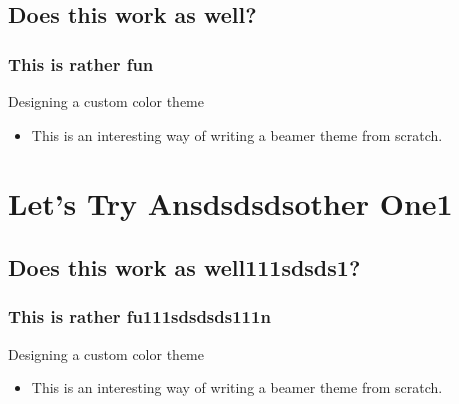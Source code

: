 \documentclass{medstarbeamer}
\begin{document}
\subsection{Does this work as well?}
\subsubsection{This is rather fun}
\begin{frame}{Designing a custom color theme}
\begin{itemize}
\item{This is an interesting way of writing a beamer theme from scratch.}
\end{itemize}
\end{frame}


\section{Let's Try Ansdsdsdsother One1}
\subsection{Does this work as well111sdsds1?}
\subsubsection{This is rather fu111sdsdsds111n}
\begin{frame}{Designing a custom color theme}
\begin{itemize}
\item{This is an interesting way of writing a beamer theme from scratch.}
\end{itemize}
\end{frame}
\end{document}
